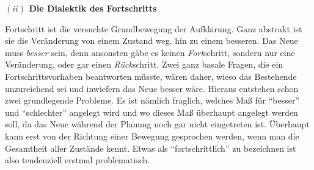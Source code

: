 \documentclass[a4paper, 12pt]{article}
\begin{document}
\begin{onehalfspace}
\vspace{5mm}
\noindent\textbf{$(ii)$ Die Dialektik des Fortschritts}

\noindent Fortschritt ist die versuchte Grundbewegung der Aufklärung. Ganz abstrakt ist sie die Veränderung von einem Zustand weg, hin zu einem besseren. Das Neue muss \emph{besser} sein, denn ansonsten gäbe es keinen \emph{Fort}schritt, sondern nur eine Veränderung, oder gar einen \emph{Rück}schritt. Zwei ganz basale Fragen, die ein Fortschrittsvorhaben beantworten müsste, wären daher, wieso das Bestehende unzureichend sei und inwiefern das Neue besser wäre. Hieraus entstehen schon zwei grundlegende Probleme. Es ist nämlich fraglich, welches Maß für "`besser"' und "`schlechter"' angelegt wird und wo dieses Maß überhaupt angelegt werden soll, da das Neue während der Planung noch gar nicht eingetreten ist. Überhaupt kann erst von der Richtung einer Bewegung gesprochen werden, wenn man die Gesamtheit aller Zustände kennt. Etwas als "`fortschrittlich"' zu bezeichnen ist also tendenziell erstmal problematisch. 


\end{onehalfspace}
\end{document}
